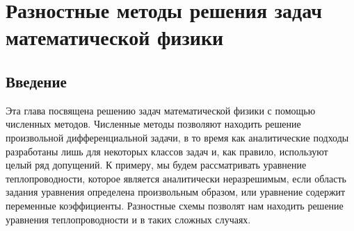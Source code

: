 \documentclass[11pt,a4paper,twoside,listtotoc,bibtotoc]{report}
\numberwithin{equation}{section}
\theoremstyle{definition}
\theoremstyle{plain}
\begin{document}
\chapter{Разностные методы решения задач математической физики}
%
%
\section{Введение}
%
Эта глава посвящена решению задач математической физики с помощью численных
методов. Численные методы позволяют находить решение произвольной
дифференциальной задачи, в то время как аналитические подходы разработаны лишь
для некоторых классов задач и, как правило, используют целый ряд
допущений. К примеру, мы будем рассматривать уравнение теплопроводности,
которое является аналитически неразрешимым, если область задания уравнения
определена произвольным образом, или уравнение содержит переменные
коэффициенты. Разностные схемы позволят нам находить решение уравнения
теплопроводности и в таких сложных случаях.
\end{document}
